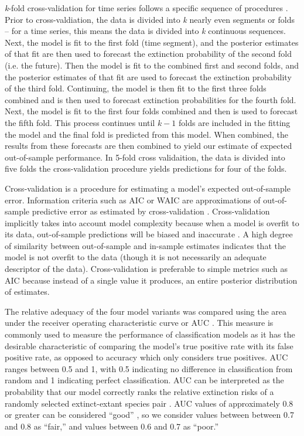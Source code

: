 \documentclass[12pt,letterpaper]{article}
\begin{document}
\begin{refsection}
\textit{k}-fold cross-validation for time series follows a specific sequence of procedures \citep{Arlot2010,Bergmeir2016,ESL}. Prior to cross-valdiation, the data is divided into \textit{k} nearly even segments or folds -- for a time series, this means the data is divided into \textit{k} continuous sequences. Next, the model is fit to the first fold (time segment), and the posterior estimates of that fit are then used to forecast the extinction probability of the second fold (i.e. the future). Then the model is fit to the combined first and second folds, and the posterior estimates of that fit are used to forecast the extinction probability of the third fold. Continuing, the model is then fit to the first three folds combined and is then used to forecast extinction probabilities for the fourth fold. Next, the model is fit to the first four folds combined and then is used to forecast the fifth fold. This process continues until $k - 1$ folds are included in the fitting the model and the final fold is predicted from this model. When combined, the results from these forecasts are then combined to yield our estimate of expected out-of-sample performance. In 5-fold cross validaition, the data is divided into five folds the cross-validation procedure yields predictions for four of the folds.

Cross-validation is a procedure for estimating a model's expected out-of-sample error. Information criteria such as AIC or WAIC are approximations of out-of-sample predictive error as estimated by cross-validation \citep{ESL,Gelman2013d}. Cross-validation implicitly takes into account model complexity because when a model is overfit to its data, out-of-sample predictions will be biased and inaccurate \citep{ESL}. A high degree of similarity between out-of-sample and in-sample estimates indicates that the model is not overfit to the data (though it is not necessarily an adequate descriptor of the data). Cross-validation is preferable to simple metrics such as AIC because instead of a single value it produces, an entire posterior distribution of estimates.

The relative adequacy of the four model variants was compared using the area under the receiver operating characteristic curve or AUC \citep{Fawcett2006,Mason2002}. This measure is commonly used to measure the performance of classification models as it has the desirable characteristic of comparing the model's true positive rate with its false positive rate, as opposed to accuracy which only considers true positives. AUC ranges between 0.5 and 1, with 0.5 indicating no difference in classification from random and 1 indicating perfect classification. AUC can be interpreted as the probability that our model correctly ranks the relative extinction risks of a randomly selected extinct-extant species pair \citep{Fawcett2006,Mason2002}. AUC values of approximately 0.8 or greater can be considered ``good'' \citep{ACCDA}, so we consider values between between 0.7 and 0.8 as ``fair,'' and values between 0.6 and 0.7 as ``poor.''


\end{refsection}
\end{document}
